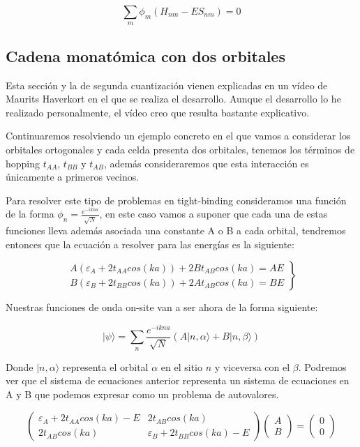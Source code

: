 \documentclass{article} %
\begin{document}
\begin{equation}
\sum_m \phi_m (H_{nm} - ES_{nm}) = 0
\end{equation}

\subsection{Cadena monatómica con dos orbitales}

Esta sección y la de segunda cuantización vienen explicadas en un vídeo de Maurits Haverkort en el que se realiza el desarrollo. Aunque el desarrollo lo he realizado personalmente, el vídeo creo que resulta bastante explicativo. \cite{videoTB}

Continuaremos resolviendo un ejemplo concreto en el que vamos a considerar los orbitales ortogonales y cada celda presenta dos orbitales, tenemos los términos de hopping $t_{AA}$, $t_{BB}$ y $t_{AB}$, además consideraremos que esta interacción es únicamente a primeros vecinos.

Para resolver este tipo de problemas en tight-binding consideramos una función de la forma $\phi_n = \frac{e^{-ikna}}{\sqrt{N}}$, en este caso vamos a suponer que cada una de estas funciones lleva además asociada una constante A o B a cada orbital, tendremos entonces que la ecuación a resolver para las energías es la siguiente:

$$
\left. \begin{array}{c}
A (\varepsilon_A + 2t_{AA}cos(ka)) + 2Bt_{AB}cos(ka) = AE \\
B (\varepsilon_B + 2t_{BB}cos(ka)) + 2At_{AB}cos(ka) = BE
\end{array} \right\}
$$

Nuestras funciones de onda on-site van a ser ahora de la forma siguiente:

$$
|\psi\rangle = \sum_n\frac{e^{-ikna}}{\sqrt{N}}\left(A|n, \alpha\rangle + B|n, \beta\rangle\right) 
$$

Donde $|n, \alpha\rangle$ representa el orbital $\alpha$ en el sitio $n$ y viceversa con el $\beta$. Podremos ver que el sistema de ecuaciones anterior representa un sistema de ecuaciones en A y B que podemos expresar como un problema de autovalores.

$$
\left( \begin{array}{cc}
\varepsilon_A + 2t_{AA}cos(ka) - E & 2t_{AB}cos(ka) \\
2t_{AB}cos(ka) & \varepsilon_B + 2t_{BB}cos(ka) - E
\end{array} \right)\left(\begin{array}{c}
A \\
B
\end{array}\right) = \left(\begin{array}{c}
0 \\
0
\end{array}\right)
$$
\end{document}
